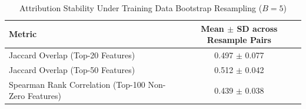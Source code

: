 \begin{table}[t]
\centering
\caption{Attribution Stability Under Training Data Bootstrap Resampling ($B=5$)}
\label{tab:shap_stability}
\small
\begin{tabular}{lc}
\hline
\textbf{Metric} & \textbf{Mean $\pm$ SD across Resample Pairs} \\
\hline
Jaccard Overlap (Top-20 Features) & 0.497 $\pm$ 0.077 \\
Jaccard Overlap (Top-50 Features) & 0.512 $\pm$ 0.042 \\
Spearman Rank Correlation (Top-100 Non-Zero Features) & 0.439 $\pm$ 0.038 \\
\hline
\end{tabular}
\end{table}
